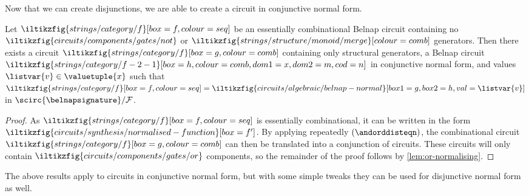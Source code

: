 \begin{example}
\end{example}

Now that we can create disjunctions, we are able to create a circuit in
conjunctive normal form.

\begin{proposition}\label{prop:conjunctive-normal-form}
    Let \(
    \iltikzfig{strings/category/f}[box=f,colour=seq]
    \) be an essentially combinational Belnap circuit containing no \(
    \iltikzfig{circuits/components/gates/not}
    \) or \(
    \iltikzfig{strings/structure/monoid/merge}[colour=comb]
    \) generators.
    Then there exists a circuit \(
    \iltikzfig{strings/category/f}[box=g,colour=comb]
    \) containing only structural generators, a Belnap circuit \(
    \iltikzfig{strings/category/f-2-1}[box=h,colour=comb,dom1=x,dom2=m,cod=n]
    \) in conjunctive normal form, and values \(\listvar{v} \in \valuetuple{x}\)
    such that \(
    \iltikzfig{strings/category/f}[box=f,colour=seq]
    =
    \iltikzfig{circuits/algebraic/belnap-normal}[box1=g,box2=h,val=\listvar{v}]
    \) in \(
    \scirc{\belnapsignature} / \mathcal{F}
    \).
\end{proposition}
\begin{proof}
    As \(
    \iltikzfig{strings/category/f}[box=f,colour=seq]
    \) is essentially combinational, it can be written in the form \(
    \iltikzfig{circuits/synthesis/normalised-function}[box=f^\prime]
    \).
    By applying repeatedly \((\andorddisteqn)\), the combinational circuit \(
    \iltikzfig{strings/category/f}[box=g,colour=comb]
    \) can then be translated into a conjunction of circuits.
    These circuits will only contain \(
    \iltikzfig{circuits/components/gates/or}
    \) components, so the remainder of the proof follows by
    \cref{lem:or-normalising}.
\end{proof}

The above results apply to circuits in conjunctive normal form, but with some
simple tweaks they can be used for disjunctive normal form as well.

